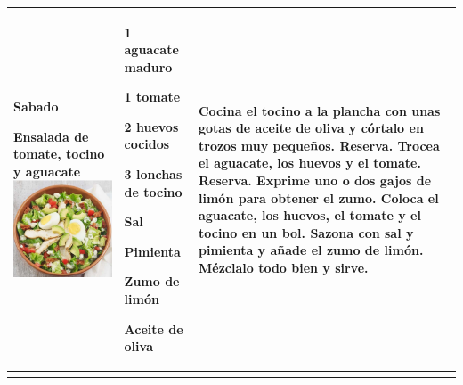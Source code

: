 \documentclass[menu.tex]{subfiles}
\begin{document}
\begin{tabular} {p{3.5cm} p{4cm} p{9cm}}
    \pbox{20cm}
    {
        \rule{0pt}{3ex}\begin{large}\textbf{Sabado}\end{large}\\ 
        \rule{0pt}{2ex}Ensalada de tomate,\\ tocino y aguacate \\
        \includegraphics[scale=0.4]{ensalada-bacon-palta} 
    } & 
    \vspace{-2.4cm}
    \begin{compactitem} 
        \begin{footnotesize}
            \item 1 aguacate maduro
            \item 1 tomate
            \item 2 huevos cocidos
            \item 3 lonchas de tocino
            \item Sal
            \item Pimienta
            \item Zumo de limón
            \item Aceite de oliva
        \end{footnotesize}
    \end{compactitem}&
    \vspace{-2.4cm}
    Cocina el tocino a la plancha con unas gotas de aceite de oliva y córtalo en trozos muy pequeños. Reserva.
    Trocea el aguacate, los huevos y el tomate. Reserva.
    Exprime uno o dos gajos de limón para obtener el zumo.
    Coloca el aguacate, los huevos, el tomate y el tocino en un bol.
    Sazona con sal y pimienta y añade el zumo de limón.
    Mézclalo todo bien y sirve.\\
    \hline

    \newpage        
    \end{tabular}
\end{document}
